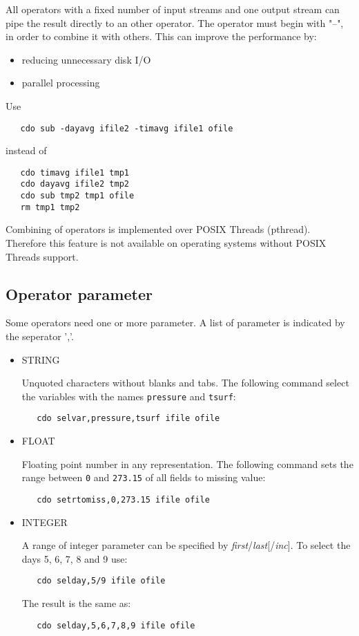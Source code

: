 All operators with a fixed number of input streams and one output stream
can pipe the result directly to an other operator.
The operator must begin with "--", in order to combine it with others.
This can improve the performance by:
\begin{itemize}
\item reducing unnecessary disk I/O
\item parallel processing
\end{itemize}
Use
\begin{verbatim}
   cdo sub -dayavg ifile2 -timavg ifile1 ofile
\end{verbatim}
instead of
\begin{verbatim}
   cdo timavg ifile1 tmp1
   cdo dayavg ifile2 tmp2
   cdo sub tmp2 tmp1 ofile
   rm tmp1 tmp2
\end{verbatim}


Combining of operators is implemented over POSIX Threads (pthread).
Therefore this {\CDO} feature is not available on operating systems 
without POSIX Threads support.

\subsection{Operator parameter}

Some operators need one or more parameter.
A list of parameter is indicated by the seperator ','.

\begin{itemize}
\item STRING

Unquoted characters without blanks and tabs.
The following command select the variables with the names {\tt pressure} and {\tt tsurf}:
\begin{verbatim}
   cdo selvar,pressure,tsurf ifile ofile
\end{verbatim}

\item FLOAT

Floating point number in any representation.
The following command sets the range between {\tt 0} and {\tt 273.15}
of all fields to missing value:
\begin{verbatim}
   cdo setrtomiss,0,273.15 ifile ofile
\end{verbatim}

\item INTEGER

A range of integer parameter can be specified by {\it first}/{\it last}[/{\it inc}].
To select the days 5, 6, 7, 8 and 9 use:
\begin{verbatim}
   cdo selday,5/9 ifile ofile
\end{verbatim}
The result is the same as:
\begin{verbatim}
   cdo selday,5,6,7,8,9 ifile ofile
\end{verbatim}
\end{itemize}
